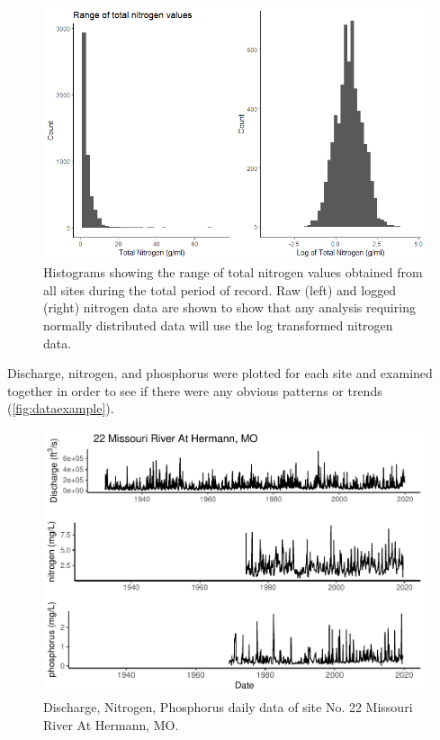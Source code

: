 \documentclass[12pt,]{article}
\makeatletter
\def\maxwidth{\ifdim\Gin@nat@width>\linewidth\linewidth\else\Gin@nat@width\fi}
\makeatother
\begin{document}
\begin{figure}[H]
\includegraphics[width=\maxwidth]{../Figures/Nitrogenhist} \caption{\label{fig:Nhist} Histograms showing the range of total nitrogen values obtained from all sites during the total period of record. Raw (left) and logged (right) nitrogen data are shown to show that any analysis requiring normally distributed data will use the log transformed nitrogen data.}\label{fig:Nhist}
\end{figure}

Discharge, nitrogen, and phosphorus were plotted for each site and
examined together in order to see if there were any obvious patterns or
trends (\autoref{fig:dataexample}).

\begin{figure}[H]
\includegraphics[width=\maxwidth]{Missouri-Reasearch-Project---FINAL_files/figure-latex/dataexample-1} \caption{\label{fig:dataexample} Discharge, Nitrogen, Phosphorus daily data of site No. 22 Missouri River At Hermann, MO.}\label{fig:dataexample}
\end{figure}
\end{document}
